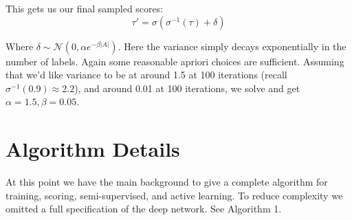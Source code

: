 \documentclass{article}
\begin{document}
This gets us our final sampled scores:
$$\tau' = \sigma(\sigma^{-1}(\tau)+\delta)$$

Where $\delta \sim  \mathcal{N}(0,\alpha e^{-\beta | A | })$.  Here the variance simply decays exponentially in the number of labels.  Again some reasonable apriori choices are sufficient.  Assuming that we'd like variance to be at around 1.5 at 100 iterations (recall $\sigma^{-1}(0.9) \approx 2.2$), and around 0.01 at 100 iterations, we solve and get $\alpha=1.5, \beta=0.05$. 

\section{Algorithm Details}
At this point we have the main background to give a complete algorithm for training, scoring, semi-supervised, and active learning.  To reduce complexity we omitted a full specification of the deep network.  See Algorithm 1.
\end{document}
